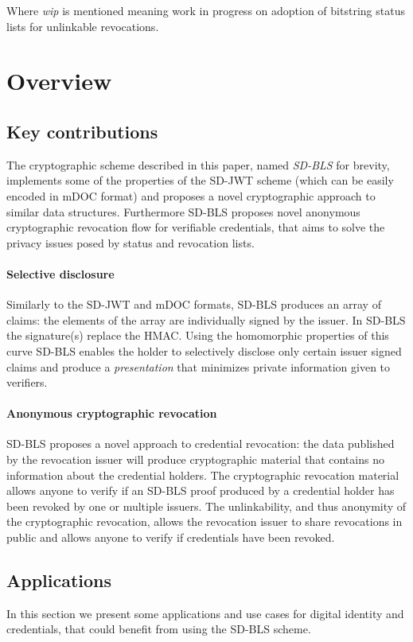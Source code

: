 Where \emph{wip} is mentioned meaning work in progress on adoption of
bitstring status lists for unlinkable revocations.

\section{Overview}

\subsection{Key contributions}
The cryptographic scheme described in this paper, named
\textit{SD-BLS} for brevity, implements some of the properties of the
SD-JWT scheme (which can be easily encoded in mDOC format) and
proposes a novel cryptographic approach to similar data
structures. Furthermore SD-BLS proposes novel anonymous cryptographic
revocation flow for verifiable credentials, that aims to solve the
privacy issues posed by status and revocation lists.

\paragraph{Selective disclosure}
Similarly to the SD-JWT and mDOC formats, SD-BLS produces an array of
claims: the elements of the array are individually signed by the
issuer. In SD-BLS the signature(s) replace the HMAC. Using the
homomorphic properties of this curve SD-BLS enables the holder to
selectively disclose only certain issuer signed claims and produce a
\textit{presentation} that minimizes private information given to
verifiers.

\paragraph{Anonymous cryptographic revocation}
SD-BLS proposes a novel approach to credential revocation: the data
published by the revocation issuer will produce cryptographic material
that contains no information about the credential holders. The
cryptographic revocation material allows anyone to verify if an SD-BLS
proof produced by a credential holder has been revoked by one or
multiple issuers. The unlinkability, and thus anonymity of the
cryptographic revocation, allows the revocation issuer to share
revocations in public and allows anyone to verify if credentials have
been revoked.

\subsection{Applications}
In this section we present some applications and use cases for digital
identity and credentials, that could benefit from using the SD-BLS
scheme.

